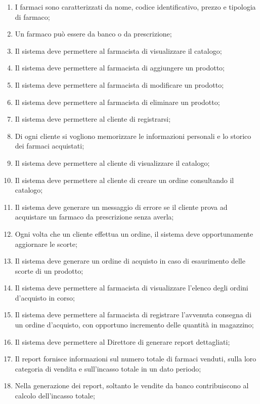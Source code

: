 \begin{enumerate}
	\item I farmaci sono caratterizzati da nome, codice identificativo, prezzo e tipologia di farmaco;
	\item Un farmaco può essere da banco o da prescrizione;
	\item Il sistema deve permettere al farmacista di visualizzare il catalogo;
	\item Il sistema deve permettere al farmacista di aggiungere un prodotto;
	\item Il sistema deve permettere al farmacista di modificare un prodotto;
	\item Il sistema deve permettere al farmacista di eliminare un prodotto;
	\item Il sistema deve permettere al cliente di registrarsi;
	\item Di ogni cliente si vogliono memorizzare le informazioni personali e lo storico dei farmaci acquistati;
	\item Il sistema deve permettere al cliente di visualizzare il catalogo;
	\item Il sistema deve permettere al cliente di creare un ordine consultando il catalogo;
	\item Il sistema deve generare un messaggio di errore se il cliente prova ad acquistare un farmaco da prescrizione senza averla;
	\item Ogni volta che un cliente effettua un ordine, il sistema deve opportunamente aggiornare le scorte;
	\item Il sistema deve generare un ordine di acquisto in caso di esaurimento delle scorte di un prodotto;
	\item Il sistema deve permettere al farmacista di visualizzare l'elenco degli ordini d'acquisto in corso;
	\item Il sistema deve permettere al farmacista di registrare l'avvenuta consegna di un ordine d'acquisto, con opportuno incremento delle quantità in magazzino;
	\item Il sistema deve permettere al Direttore di generare report dettagliati;
	\item Il report fornisce informazioni sul numero totale di farmaci venduti, sulla loro categoria di vendita e sull'incasso totale in un dato periodo;
	\item Nella generazione dei report, soltanto le vendite da banco contribuiscono al calcolo dell'incasso totale;
\end{enumerate}

